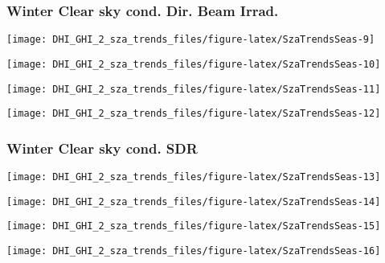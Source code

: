 \documentclass[
  10pt,
  a4paper,oneside]{article}
\begin{document}
\newpage

\hypertarget{winter-clear-sky-cond.-dir.-beam-irrad.}{%
\subsubsection{Winter Clear sky cond. Dir. Beam Irrad.}\label{winter-clear-sky-cond.-dir.-beam-irrad.}}

\begin{center}\texttt{[image: DHI\_GHI\_2\_sza\_trends\_files/figure-latex/SzaTrendsSeas-9]} \end{center}

\begin{center}\texttt{[image: DHI\_GHI\_2\_sza\_trends\_files/figure-latex/SzaTrendsSeas-10]} \end{center}

\begin{center}\texttt{[image: DHI\_GHI\_2\_sza\_trends\_files/figure-latex/SzaTrendsSeas-11]} \end{center}

\begin{center}\texttt{[image: DHI\_GHI\_2\_sza\_trends\_files/figure-latex/SzaTrendsSeas-12]} \end{center}

\newpage

\hypertarget{winter-clear-sky-cond.-sdr}{%
\subsubsection{Winter Clear sky cond. SDR}\label{winter-clear-sky-cond.-sdr}}

\begin{center}\texttt{[image: DHI\_GHI\_2\_sza\_trends\_files/figure-latex/SzaTrendsSeas-13]} \end{center}

\begin{center}\texttt{[image: DHI\_GHI\_2\_sza\_trends\_files/figure-latex/SzaTrendsSeas-14]} \end{center}

\begin{center}\texttt{[image: DHI\_GHI\_2\_sza\_trends\_files/figure-latex/SzaTrendsSeas-15]} \end{center}

\begin{center}\texttt{[image: DHI\_GHI\_2\_sza\_trends\_files/figure-latex/SzaTrendsSeas-16]} \end{center}
\end{document}
